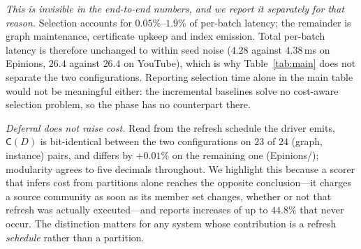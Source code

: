 \emph{This is invisible in the end-to-end numbers, and we report it separately
for that reason.} Selection accounts for $0.05\%$--$1.9\%$ of per-batch latency;
the remainder is graph maintenance, certificate upkeep and index emission. Total
per-batch latency is therefore unchanged to within seed noise
($4.28$ against $4.38$\,ms on Epinions, $26.4$ against $26.4$ on YouTube), which
is why Table~\ref{tab:main} does not separate the two configurations. Reporting
selection time alone in the main table would not be meaningful either: the
incremental baselines solve no cost-aware selection problem, so the phase has no
counterpart there.

\emph{Deferral does not raise cost.} Read from the refresh schedule the driver
emits, $\mathsf C(D)$ is bit-identical between the two configurations on $23$ of
$24$ (graph, instance) pairs, and differs by $+0.01\%$ on the remaining one
(Epinions/\Louvain{}); modularity agrees to five decimals throughout. We
highlight this because a scorer that infers cost from partitions alone reaches
the opposite conclusion---it charges a source community as soon as its member set
changes, whether or not that refresh was actually executed---and reports
increases of up to $44.8\%$ that never occur. The distinction matters for any
system whose contribution is a refresh \emph{schedule} rather than a partition.
